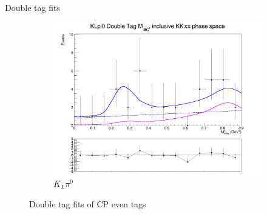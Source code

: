 \documentclass{beamer}
\begin{document}
\begin{frame}{Double tag fits}
\begin{figure}
\begin{subfigure}{0.33\textwidth}
      \includegraphics[width=1.0\textwidth]{Plots/DoubleTagYield_DoubleTag_CP_KKpipi_vs_KLpi0_SignalBin0.png}
      \caption{$K_L\pi^0$}
    \end{subfigure}
    \caption{Double tag fits of CP even tags}
  \end{figure}
\end{frame}
\end{document}
